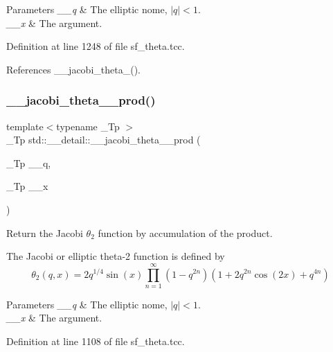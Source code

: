 \begin{DoxyParams}{Parameters}
{\em \+\_\+\+\_\+q} & The elliptic nome, $ |q| < 1 $. \\
\hline
{\em \+\_\+\+\_\+x} & The argument. \\
\hline
\end{DoxyParams}


Definition at line 1248 of file sf\+\_\+theta.\+tcc.



References \+\_\+\+\_\+jacobi\+\_\+theta\+\_().

\mbox{\label{namespacestd_1_1____detail_acc790f257c25f021704f9c9e1ad9df29}} 
\subsubsection{\texorpdfstring{\+\_\+\+\_\+jacobi\+\_\+theta\+\_\+\_\+prod()}{\_\_jacobi\_theta\_2\_prod()}}
{\footnotesize\ttfamily template$<$typename \+\_\+\+Tp $>$ \\
\+\_\+\+Tp std\+::\+\_\+\+\_\+detail\+::\+\_\+\+\_\+jacobi\+\_\+theta\+\_\+\_\+prod (\begin{DoxyParamCaption}\item[{\+\_\+\+Tp}]{\+\_\+\+\_\+q,  }\item[{\+\_\+\+Tp}]{\+\_\+\+\_\+x }\end{DoxyParamCaption})}

Return the Jacobi $ \theta_2 $ function by accumulation of the product.

The Jacobi or elliptic theta-\/2 function is defined by \[ \theta_2(q,x) = 2 q^{1/4} \sin(x) \prod_{n=1}^{\infty} (1 - q^{2n})(1 + 2q^{2n}\cos(2x) + q^{4n}) \]


\begin{DoxyParams}{Parameters}
{\em \+\_\+\+\_\+q} & The elliptic nome, $ |q| < 1 $. \\
\hline
{\em \+\_\+\+\_\+x} & The argument. \\
\hline
\end{DoxyParams}


Definition at line 1108 of file sf\+\_\+theta.\+tcc.



